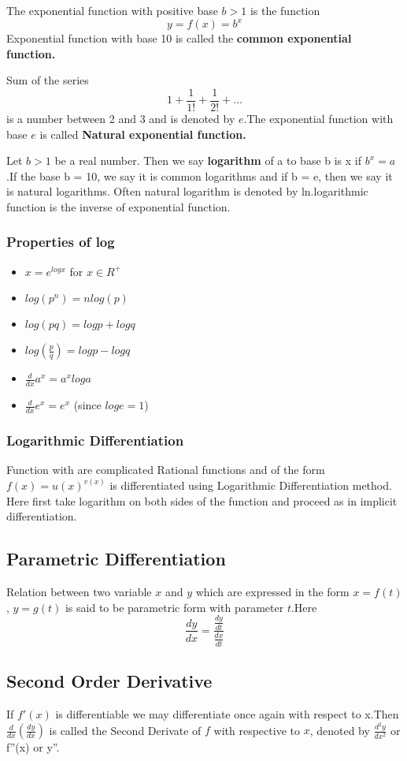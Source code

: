 \documentclass[12pt]{article}
\begin{document}
\begin{multicols*}{2}
  The exponential function with positive base $b > 1$ is the function
  $$y = f(x)=b^x$$
  Exponential function with base 10 is called the \textbf{common exponential function.}


  Sum of the series $$1+\frac{1}{1!}+\frac{1}{2!}+\dots $$ is a number between 2 and 3 and is denoted by $e$.The exponential function with base $e$ is called \textbf{Natural exponential function.} 
 
  Let $b > 1$ be a real number. Then we say \textbf{logarithm} of a to base b is x if
$b^x = a$.If the base b = 10, we say it
is common logarithms and if b = e, then
we say it is natural logarithms. Often
natural logarithm is denoted by ln.logarithmic function is the inverse of exponential function. 

\subsubsection*{Properties of log}
\begin{itemize}
    \item $x= e^{{log x }}$ for  $x \in R^+$
    \item $log(p^n)=n log(p)$
    \item $log (pq)=log p + log q$
    \item $log(\frac{p}{q})=log p - log q$
    \item $\frac{d}{dx} a^x=a^x log a $ 
    \item $\frac{d}{dx} e^x =e^x$ (since $log  e =1$)
\end{itemize}
\subsubsection*{ Logarithmic Differentiation}
Function with are complicated Rational functions and of the form $f(x) = u(x)^{v(x)}$ is differentiated using Logarithmic Differentiation method. Here first take logarithm on both sides of the function and proceed as in implicit differentiation.

\subsection*{Parametric Differentiation}
Relation between two variable $x$ and $y$ which are expressed in the form $x = f(t)$, $y = g(t)$ is said to be parametric form with parameter $t$.Here
$$\frac{dy}{dx}=\frac{\frac{dy}{dt}}{\frac{dx}{dt}}$$

\subsection*{ Second Order Derivative}
If $f'(x)$ is differentiable we may differentiate once again with respect to x.Then $\frac{d}{dx}(\frac{dy}{dx})$ is called the Second Derivate of $f$ with respective to $x$, denoted by $\frac{d^2 y}{dx^2}$ or f”(x) or y”.














    
\end{multicols*}
\end{document}
